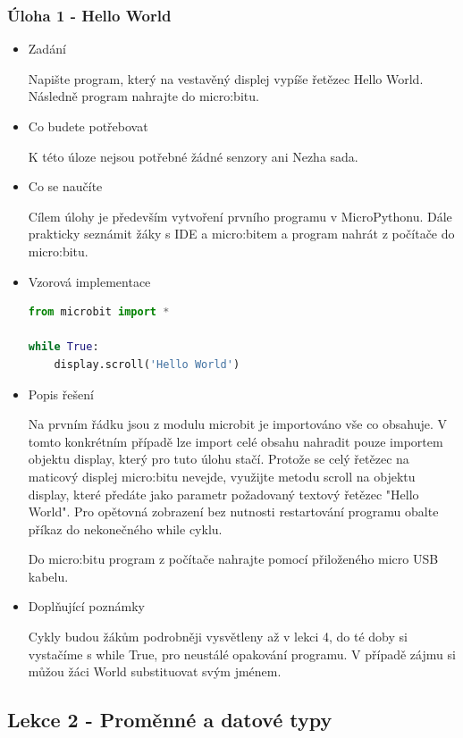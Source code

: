 \documentclass[
  digital,     %
  oneside,     %
  nosansbold,  %
  colorbold, %
  lof,         %
  nolot,         %
]{fithesis4}
\begin{document}
\subsubsection{Úloha 1 - Hello World}
\begin{itemize}
    \item Zadání

Napište program, který na vestavěný displej vypíše řetězec Hello World. Následně program nahrajte do micro:bitu.
    \item Co budete potřebovat

K této úloze nejsou potřebné žádné senzory ani Nezha sada.
    \item Co se naučíte

Cílem úlohy je především vytvoření prvního programu v MicroPythonu. Dále prakticky seznámit žáky s IDE a micro:bitem a program nahrát z počítače do micro:bitu.
    \item Vzorová implementace
\begin{lstlisting}[language=Python, caption=Úloha 1 - Hello World]
from microbit import *

while True:
    display.scroll('Hello World')
\end{lstlisting}
    \item Popis řešení

Na prvním řádku jsou z modulu microbit je importováno vše co obsahuje. V tomto konkrétním případě lze import celé obsahu nahradit pouze importem objektu display, který pro tuto úlohu stačí. Protože se celý řetězec na maticový displej micro:bitu nevejde, využijte metodu scroll na objektu display, které předáte jako parametr požadovaný textový řetězec "Hello World". Pro opětovná zobrazení bez nutnosti restartování programu obalte příkaz do nekonečného while cyklu.

Do micro:bitu program z počítače nahrajte pomocí přiloženého micro USB kabelu. %
    \item Doplňující poznámky

Cykly budou žákům podrobněji vysvětleny až v lekci 4, do té doby si vystačíme s while True, pro neustálé opakování programu. V případě zájmu si můžou žáci World substituovat svým jménem.
\end{itemize}

\subsection{Lekce 2 - Proměnné a datové typy}
\end{document}
